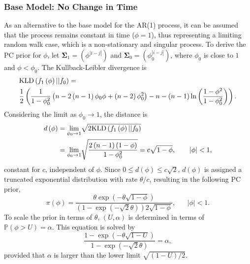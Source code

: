 \subsubsection*{Base Model: No Change in Time} 
As an alternative to the base model for the AR(1) process, it can be assumed that the process remains constant in time ($\phi = 1$), thus representing a limiting random walk case, which is a non-stationary and singular process. To derive the PC prior for $\phi$, let $\pmb{\Sigma}_1=\left(\phi^{|i-j|}\right)$ and $\pmb{\Sigma}_0=\left(\phi_0^{|i-j|}\right)$, where $\phi_0$ is close to $1$ and $\phi<\phi_0$. The Kullback-Leibler divergence is
\begin{align*}
    &\hbox{KLD}\left(f_1\left(\phi\right)||f_0\right)=\\
    &\frac{1}{2}\left(\frac{1}{1-\phi_0^2}\left(n-2\left(n-1\right)\phi_0\phi+\left(n-2\right)\phi_0^2\right)-n-\left(n-1\right)\ln\left(\frac{1-\phi^2}{1-\phi_0^2}\right)\right).
\end{align*}
Considering the limit as $\phi_0\rightarrow1$, the distance is
\begin{align*}
    d\left(\phi\right)&=\underset{\phi_0\rightarrow1}{\lim}\sqrt{2\hbox{KLD}\left(f_1\left(\phi\right)||f_0\right)} \\
    &=\underset{\phi_0\rightarrow1}{\lim}\sqrt{\frac{2\left(n-1\right)\left(1-\phi\right)}{1-\phi_0^2}} = c\sqrt{1-\phi}, \hspace{20pt}|\phi|<1,
\end{align*}
constant for $c$, independent of $\phi$. Since $0\leq d\left(\phi\right)\leq c\sqrt{2}$, $d\left(\phi\right)$ is assigned a truncated exponential distribution with rate $\theta/c$, resulting in the following PC prior,
\begin{equation}
    \pi\left(\phi\right)=\frac{\theta\exp\left(-\theta\sqrt{1-\phi}\right)}{\left(1-\exp\left(-\sqrt{2}\theta\right)\right)2\sqrt{1-\phi}}, \hspace{20pt}|\phi|<1.
\end{equation}
To scale the prior in terms of $\theta$, $\left(U,\alpha\right)$ is determined in terms of $\mathbb{P}\left(\phi>U\right)=\alpha$. This equation is solved by
\begin{equation*}
    \frac{1-\exp\left(-\theta\sqrt{1-U}\right)}{1-\exp\left(-\sqrt{2}\theta\right)}=\alpha,
\end{equation*}
provided that $\alpha$ is larger than the lower limit $\sqrt{\left(1-U\right)/2}$\autocite[Cf.][]{sorbye2017penalised}.
\clearpage
